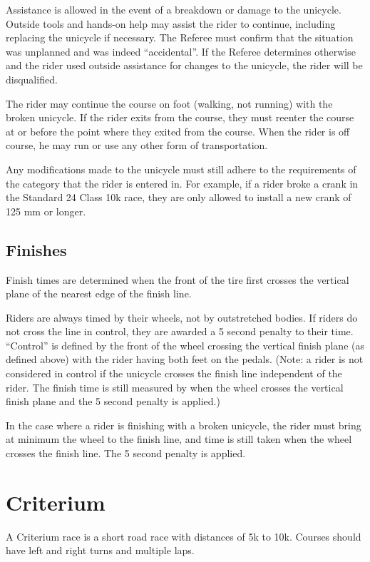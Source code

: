 Assistance is allowed in the event of a breakdown or damage to the unicycle.
Outside tools and hands-on help may assist the rider to continue, including replacing the unicycle if necessary.
The Referee must confirm that the situation was unplanned and was indeed ``accidental''.
If the Referee determines otherwise and the rider used outside assistance for changes to the unicycle, the rider will be disqualified.

The rider may continue the course on foot (walking, not running) with the broken unicycle.
If the rider exits from the course, they must reenter the course at or before the point where they exited from the course.
When the rider is off course, he may run or use any other form of transportation.

Any modifications made to the unicycle must still adhere to the requirements of the category that the rider is entered in.
For example, if a rider broke a crank in the Standard 24 Class 10k race, they are only allowed to install a new crank of 125 mm or longer.


\subsection{Finishes}

Finish times are determined when the front of the tire first crosses the vertical plane of the nearest edge of the finish line.

Riders are always timed by their wheels, not by outstretched bodies.
If riders do not cross the line in control, they are awarded a 5 second penalty to their time.
``Control'' is defined by the front of the wheel crossing the vertical finish plane (as defined above) with the rider having both feet on the pedals.
(Note: a rider is not considered in control if the unicycle crosses the finish line independent of the rider.
The finish time is still measured by when the wheel crosses the vertical finish plane and the 5 second penalty is applied.)

In the case where a rider is finishing with a broken unicycle, the rider must bring at minimum the wheel to the finish line, and time is still taken when the wheel crosses the finish line.
The 5 second penalty is applied.

\section{Criterium}
A Criterium race is a short road race with distances of 5k to 10k.
Courses should have left and right turns and multiple laps.
